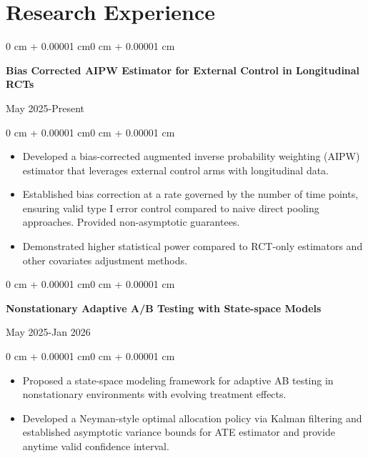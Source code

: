 \documentclass[10pt, letterpaper]{article}
\newenvironment{highlights}{
    \begin{itemize}[
        topsep=0.10 cm,
        parsep=0.10 cm,
        partopsep=0pt,
        itemsep=0pt,
        leftmargin=0 cm + 10pt
    ]
}{\end{itemize}}
\newenvironment{onecolentry}{
    \begin{adjustwidth}{0 cm + 0.00001 cm}{0 cm + 0.00001 cm}
}{\end{adjustwidth}}
\newenvironment{twocolentry}[2][]{
    \onecolentry
    \def\secondColumn{#2}
    \noindent\begin{minipage}[t]{\dimexpr\linewidth-4.7cm\relax}
}{
    \end{minipage}\hfill
    \begin{minipage}[t]{4.5cm}
        \raggedleft \secondColumn
    \end{minipage}
    \endonecolentry
}
\begin{document}
\vspace{0.10 cm}

\section{Research Experience}

\begin{twocolentry}{May 2025-Present}
    \textbf{Bias Corrected AIPW Estimator for External Control in Longitudinal RCTs}\\
\end{twocolentry}
\vspace{0.05 cm}
\begin{onecolentry}
    \begin{highlights}
        \item Developed a bias-corrected augmented inverse probability weighting (AIPW) estimator that leverages external control arms with longitudinal data.
        \item Established bias correction at a rate governed by the number of time points, ensuring valid type I error control compared to naive direct pooling approaches. Provided non-asymptotic guarantees.
        \item Demonstrated higher statistical power compared to RCT-only estimators and other covariates adjustment methods.
    \end{highlights}
\end{onecolentry}
\vspace{0.10 cm}
\begin{twocolentry}{May 2025-Jan 2026}
    \textbf{Nonstationary Adaptive A/B Testing with State-space Models}\\
\end{twocolentry}
\vspace{0.05 cm}
\begin{onecolentry}
    \begin{highlights}
        \item Proposed a state-space modeling framework for adaptive AB testing in nonstationary environments with evolving treatment effects.
        \item Developed a Neyman-style optimal allocation policy via Kalman filtering and established asymptotic variance bounds for  ATE estimator and provide anytime valid confidence interval.
    \end{highlights}
\end{onecolentry}
\vspace{0.10 cm}
\end{document}
